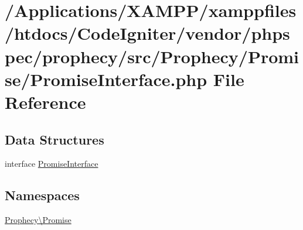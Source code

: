 \hypertarget{_promise_interface_8php}{}\section{/\+Applications/\+X\+A\+M\+P\+P/xamppfiles/htdocs/\+Code\+Igniter/vendor/phpspec/prophecy/src/\+Prophecy/\+Promise/\+Promise\+Interface.php File Reference}
\label{_promise_interface_8php}
\subsection*{Data Structures}
\begin{DoxyCompactItemize}
\item 
interface \mbox{\hyperlink{interface_prophecy_1_1_promise_1_1_promise_interface}{Promise\+Interface}}
\end{DoxyCompactItemize}
\subsection*{Namespaces}
\begin{DoxyCompactItemize}
\item 
 \mbox{\hyperlink{namespace_prophecy_1_1_promise}{Prophecy\textbackslash{}\+Promise}}
\end{DoxyCompactItemize}

